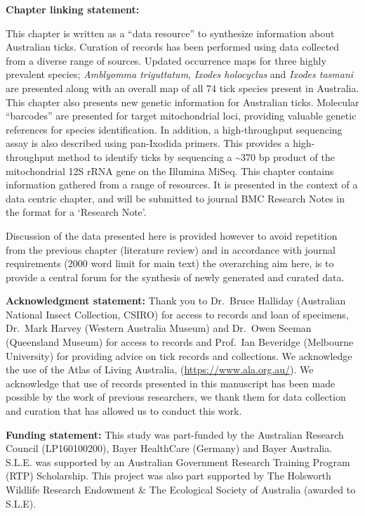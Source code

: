 \documentclass[a4paper, nobind]{templates/ociamthesis}
\begin{document}
\newpage

\textbf{Chapter linking statement:}

This chapter is written as a ``data resource'' to synthesize information about Australian ticks.
Curation of records has been performed using data collected from a diverse range of sources.
Updated occurrence maps for three highly prevalent species; \emph{Amblyomma triguttatum}, \emph{Ixodes holocyclus} and \emph{Ixodes tasmani} are presented along with an overall map of all 74 tick species present in Australia. This chapter also presents new genetic information for Australian ticks.
Molecular ``barcodes'' are presented for target mitochondrial loci, providing valuable genetic references for species identification. In addition, a high-throughput sequencing assay is also described using pan-Ixodida primers.
This provides a high-throughput method to identify ticks by sequencing a \textasciitilde370 bp product of the mitochondrial 12S rRNA gene on the Illumina MiSeq.
This chapter contains information gathered from a range of resources.
It is presented in the context of a data centric chapter, and will be submitted to journal BMC Research Notes in the format for a `Research Note'.

Discussion of the data presented here is provided however to avoid repetition from the previous chapter (literature review) and in accordance with journal requirements (2000 word limit for main text) the overarching aim here, is to provide a central forum for the synthesis of newly generated and curated data.

\vspace{5mm}

\textbf{Acknowledgment statement:}
Thank you to Dr.~Bruce Halliday (Australian National Insect Collection, CSIRO) for access to records and loan of specimens, Dr.~Mark Harvey (Western Australia Museum) and Dr.~Owen Seeman (Queensland Museum) for access to records and Prof.~Ian Beveridge (Melbourne University) for providing advice on tick records and collections.
We acknowledge the use of the Atlas of Living Australia, (\url{https://www.ala.org.au/}).
We acknowledge that use of records presented in this manuscript has been made possible by the work of previous researchers, we thank them for data collection and curation that has allowed us to conduct this work.

\vspace{5mm}

\textbf{Funding statement:}
This study was part-funded by the Australian Research Council (LP160100200), Bayer HealthCare (Germany) and Bayer Australia.
S.L.E. was supported by an Australian Government Research Training Program (RTP) Scholarship.
This project was also part supported by The Holsworth Wildlife Research Endowment \& The Ecological Society of Australia (awarded to S.L.E).
\end{document}
